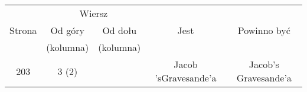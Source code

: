 \documentclass[a4paper,11pt]{article}
\numberwithin{equation}{section}
\begin{document}


\begin{center}

  \begin{tabular}{|c|c|c|c|c|}
    \hline
    & \multicolumn{2}{c|}{Wiersz} & & \\ \cline{2-3}
    Strona & Od góry & Od dołu & Jest & Powinno być \\
    & (kolumna) & (kolumna) & & \\
    \hline
    203 & 3 (2) & & Jacob 'sGravesande'a & Jacob's Gravesande'a \\
    \hline
  \end{tabular}

\end{center}

\VerSpaceTwo













\printbibliography





\end{document}
